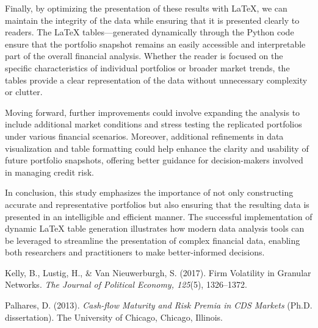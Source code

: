 \documentclass{article}
\begin{document}
Finally, by optimizing the presentation of these results with LaTeX, we can maintain the integrity of the data while ensuring that it is presented clearly to readers. The LaTeX tables—generated dynamically through the Python code ensure that the portfolio snapshot remains an easily accessible and interpretable part of the overall financial analysis. Whether the reader is focused on the specific characteristics of individual portfolios or broader market trends, the tables provide a clear representation of the data without unnecessary complexity or clutter.

Moving forward, further improvements could involve expanding the analysis to include additional market conditions and stress testing the replicated portfolios under various financial scenarios. Moreover, additional refinements in data visualization and table formatting could help enhance the clarity and usability of future portfolio snapshots, offering better guidance for decision-makers involved in managing credit risk.

In conclusion, this study emphasizes the importance of not only constructing accurate and representative portfolios but also ensuring that the resulting data is presented in an intelligible and efficient manner. The successful implementation of dynamic LaTeX table generation illustrates how modern data analysis tools can be leveraged to streamline the presentation of complex financial data, enabling both researchers and practitioners to make better-informed decisions.



\begin{thebibliography}{9}

    Kelly, B., Lustig, H., \& Van Nieuwerburgh, S. (2017). Firm Volatility in Granular Networks. 
    \textit{The Journal of Political Economy, 125}(5), 1326–1372.
    
    Palhares, D. (2013). \textit{Cash-flow Maturity and Risk Premia in CDS Markets} (Ph.D. dissertation). 
    The University of Chicago, Chicago, Illinois.
    
    \end{thebibliography}
    
\end{document}
